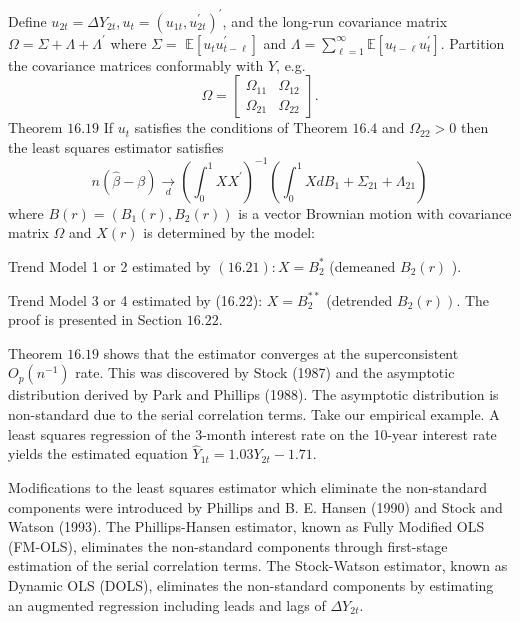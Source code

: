 \documentclass[10pt]{article}
\begin{document}
Define $u_{2 t}=\Delta Y_{2 t}, u_{t}=\left(u_{1 t}, u_{2 t}^{\prime}\right)^{\prime}$, and the long-run covariance matrix $\Omega=\Sigma+\Lambda+\Lambda^{\prime}$ where $\Sigma=$ $\mathbb{E}\left[u_{t} u_{t-\ell}^{\prime}\right]$ and $\Lambda=\sum_{\ell=1}^{\infty} \mathbb{E}\left[u_{t-\ell} u_{t}^{\prime}\right]$. Partition the covariance matrices conformably with $Y$, e.g.
$$
\Omega=\left[\begin{array}{ll}
\Omega_{11} & \Omega_{12} \\
\Omega_{21} & \Omega_{22}
\end{array}\right] .
$$
Theorem $16.19$ If $u_{t}$ satisfies the conditions of Theorem $16.4$ and $\Omega_{22}>0$ then the least squares estimator satisfies
$$
n(\widehat{\beta}-\beta) \underset{d}{\longrightarrow}\left(\int_{0}^{1} X X^{\prime}\right)^{-1}\left(\int_{0}^{1} X d B_{1}+\Sigma_{21}+\Lambda_{21}\right)
$$
where $B(r)=\left(B_{1}(r), B_{2}(r)\right)$ is a vector Brownian motion with covariance matrix $\Omega$ and $X(r)$ is determined by the model:

Trend Model 1 or 2 estimated by $(16.21): X=B_{2}^{*}$ (demeaned $B_{2}(r)$ ).

Trend Model 3 or 4 estimated by (16.22): $X=B_{2}^{* *}$ (detrended $\left.B_{2}(r)\right)$. The proof is presented in Section $16.22$.

Theorem $16.19$ shows that the estimator converges at the superconsistent $O_{p}\left(n^{-1}\right)$ rate. This was discovered by Stock (1987) and the asymptotic distribution derived by Park and Phillips (1988). The asymptotic distribution is non-standard due to the serial correlation terms. Take our empirical example. A least squares regression of the 3-month interest rate on the 10-year interest rate yields the estimated equation $\widehat{Y}_{1 t}=1.03 Y_{2 t}-1.71$.

Modifications to the least squares estimator which eliminate the non-standard components were introduced by Phillips and B. E. Hansen (1990) and Stock and Watson (1993). The Phillips-Hansen estimator, known as Fully Modified OLS (FM-OLS), eliminates the non-standard components through first-stage estimation of the serial correlation terms. The Stock-Watson estimator, known as Dynamic OLS (DOLS), eliminates the non-standard components by estimating an augmented regression including leads and lags of $\Delta Y_{2 t}$.
\end{document}
